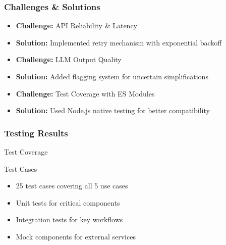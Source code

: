 \documentclass{beamer}
\begin{document}
\begin{frame}
  \frametitle{Challenges \& Solutions}
  
  \begin{itemize}
    \item \textbf{Challenge:} API Reliability \& Latency
    \item \textbf{Solution:} Implemented retry mechanism with exponential backoff
  \end{itemize}
  
  \vspace{0.4cm}
  
  \begin{itemize}
    \item \textbf{Challenge:} LLM Output Quality
    \item \textbf{Solution:} Added flagging system for uncertain simplifications
  \end{itemize}
  
  \vspace{0.4cm}
  
  \begin{itemize}
    \item \textbf{Challenge:} Test Coverage with ES Modules
    \item \textbf{Solution:} Used Node.js native testing for better compatibility
  \end{itemize}
\end{frame}

\begin{frame}
  \frametitle{Testing Results}
  
  \begin{block}{\textcolor{rxwhite}{Test Coverage}}
    \begin{center}
    \end{center}
  \end{block}
  
  \begin{block}{\textcolor{rxwhite}{Test Cases}}
    \begin{itemize}
      \item 25 test cases covering all 5 use cases
      \item Unit tests for critical components
      \item Integration tests for key workflows
      \item Mock components for external services
    \end{itemize}
  \end{block}
\end{frame}
\end{document}
